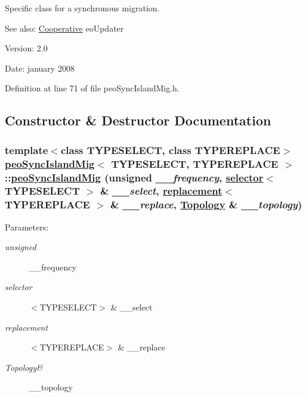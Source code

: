 Specific class for a synchronous migration. 

\begin{Desc}
\item[See also:]\hyperlink{classCooperative}{Cooperative} eo\-Updater \end{Desc}
\begin{Desc}
\item[Version:]2.0 \end{Desc}
\begin{Desc}
\item[Date:]january 2008 \end{Desc}




Definition at line 71 of file peo\-Sync\-Island\-Mig.h.

\subsection{Constructor \& Destructor Documentation}
\hypertarget{classpeoSyncIslandMig_24f4d1ea8bb63c09b9d6cd8476014082}{
\subsubsection[peoSyncIslandMig]{\setlength{\rightskip}{0pt plus 5cm}template$<$class TYPESELECT, class TYPEREPLACE$>$ \hyperlink{classpeoSyncIslandMig}{peo\-Sync\-Island\-Mig}$<$ TYPESELECT, TYPEREPLACE $>$::\hyperlink{classpeoSyncIslandMig}{peo\-Sync\-Island\-Mig} (unsigned {\em \_\-\_\-frequency}, \hyperlink{classselector}{selector}$<$ TYPESELECT $>$ \& {\em \_\-\_\-select}, \hyperlink{classreplacement}{replacement}$<$ TYPEREPLACE $>$ \& {\em \_\-\_\-replace}, \hyperlink{classTopology}{Topology} \& {\em \_\-\_\-topology})}}
\label{classpeoSyncIslandMig_24f4d1ea8bb63c09b9d6cd8476014082}


\begin{Desc}
\item[Parameters:]
\begin{description}
\item[{\em unsigned}]\_\-\_\-frequency \item[{\em selector}]$<$TYPESELECT$>$ \& \_\-\_\-select \item[{\em replacement}]$<$TYPEREPLACE$>$ \& \_\-\_\-replace \item[{\em Topology\&}]\_\-\_\-topology \end{description}
\end{Desc}


